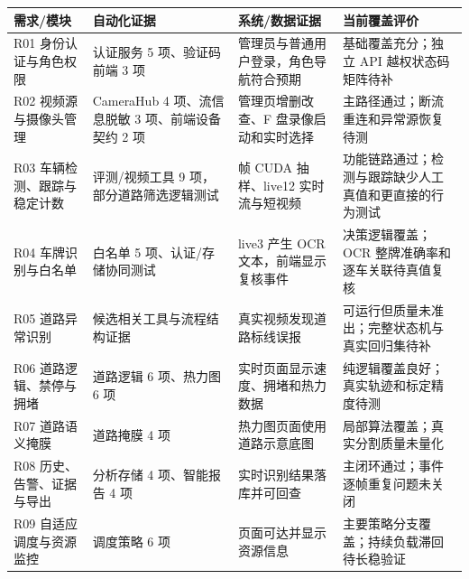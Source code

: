 \begin{longtable}[]{@{}
  >{\raggedright\arraybackslash}p{}
  >{\raggedright\arraybackslash}p{}
  >{\raggedright\arraybackslash}p{}
  >{\raggedright\arraybackslash}p{}@{}}
\toprule\noalign{}
\begin{minipage}[b]{\linewidth}\raggedright
需求/模块
\end{minipage} & \begin{minipage}[b]{\linewidth}\raggedright
自动化证据
\end{minipage} & \begin{minipage}[b]{\linewidth}\raggedright
系统/数据证据
\end{minipage} & \begin{minipage}[b]{\linewidth}\raggedright
当前覆盖评价
\end{minipage} \\
\midrule\noalign{}
\endhead
\bottomrule\noalign{}
\endlastfoot
R01 身份认证与角色权限 & 认证服务 5 项、验证码前端 3 项 & 管理员与普通用户登录，角色导航符合预期 & 基础覆盖充分；独立 API 越权状态码矩阵待补 \\
R02 视频源与摄像头管理 & CameraHub 4 项、流信息脱敏 3 项、前端设备契约 2 项 & 管理页增删改查、F 盘录像启动和实时选择 & 主路径通过；断流重连和异常源恢复待测 \\
R03 车辆检测、跟踪与稳定计数 & 评测/视频工具 9 项，部分道路筛选逻辑测试 & 65 帧 CUDA 抽样、live12 实时流与短视频 & 功能链路通过；检测与跟踪缺少人工真值和更直接的行为测试 \\
R04 车牌识别与白名单 & 白名单 5 项、认证/存储协同测试 & live3 产生 OCR 文本，前端显示复核事件 & 决策逻辑覆盖；OCR 整牌准确率和逐车关联待真值复核 \\
R05 道路异常识别 & 候选相关工具与流程结构证据 & 真实视频发现道路标线误报 & 可运行但质量未准出；完整状态机与真实回归集待补 \\
R06 道路逻辑、禁停与拥堵 & 道路逻辑 6 项、热力图 6 项 & 实时页面显示速度、拥堵和热力数据 & 纯逻辑覆盖良好；真实轨迹和标定精度待测 \\
R07 道路语义掩膜 & 道路掩膜 4 项 & 热力图页面使用道路示意底图 & 局部算法覆盖；真实分割质量未量化 \\
R08 历史、告警、证据与导出 & 分析存储 4 项、智能报告 4 项 & 实时识别结果落库并可回查 & 主闭环通过；事件逐帧重复问题未关闭 \\
R09 自适应调度与资源监控 & 调度策略 6 项 & 页面可达并显示资源信息 & 主要策略分支覆盖；持续负载滞回待长稳验证 \\

\end{longtable}
